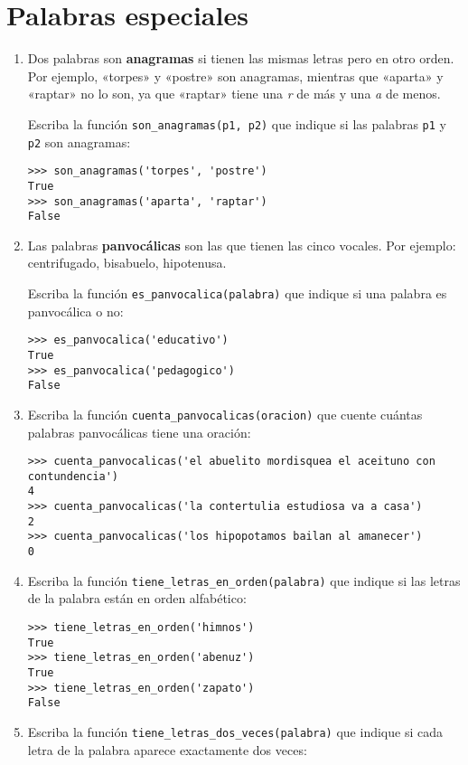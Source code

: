 \section{Palabras especiales}

\begin{enumerate}
\item
  Dos palabras son \textbf{anagramas} si tienen las mismas letras pero
  en otro orden. Por ejemplo, «torpes» y «postre» son anagramas,
  mientras que «aparta» y «raptar» no lo son, ya que «raptar» tiene una
  \emph{r} de más y una \emph{a} de menos.

  Escriba la función \lstinline!son_anagramas(p1, p2)! que indique si
  las palabras \lstinline!p1! y \lstinline!p2! son anagramas:

\begin{lstlisting}
>>> son_anagramas('torpes', 'postre')
True
>>> son_anagramas('aparta', 'raptar')
False
\end{lstlisting}
\item
  Las palabras \textbf{panvocálicas} son las que tienen las cinco
  vocales. Por ejemplo: centrifugado, bisabuelo, hipotenusa.

  Escriba la función \lstinline!es_panvocalica(palabra)! que indique si
  una palabra es panvocálica o no:

\begin{lstlisting}
>>> es_panvocalica('educativo')
True
>>> es_panvocalica('pedagogico')
False
\end{lstlisting}
\item
  Escriba la función \lstinline!cuenta_panvocalicas(oracion)! que cuente
  cuántas palabras panvocálicas tiene una oración:

\begin{lstlisting}
>>> cuenta_panvocalicas('el abuelito mordisquea el aceituno con contundencia')
4
>>> cuenta_panvocalicas('la contertulia estudiosa va a casa')
2
>>> cuenta_panvocalicas('los hipopotamos bailan al amanecer')
0
\end{lstlisting}
\item
  Escriba la función \lstinline!tiene_letras_en_orden(palabra)! que
  indique si las letras de la palabra están en orden alfabético:

\begin{lstlisting}
>>> tiene_letras_en_orden('himnos')
True
>>> tiene_letras_en_orden('abenuz')
True
>>> tiene_letras_en_orden('zapato')
False
\end{lstlisting}
\item
  Escriba la función \lstinline!tiene_letras_dos_veces(palabra)! que
  indique si cada letra de la palabra aparece exactamente dos veces:


\end{enumerate}
